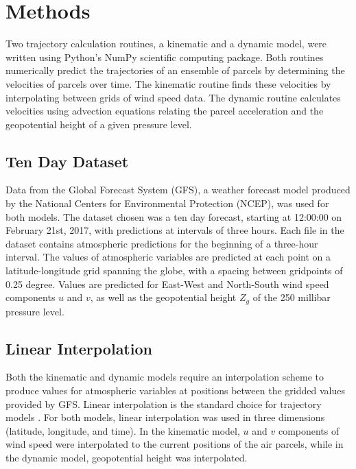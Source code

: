 \chapter{Methods}

Two trajectory calculation routines, a kinematic and a dynamic model, were written using Python's NumPy scientific computing package.
Both routines numerically predict the trajectories of an ensemble of parcels by determining the velocities of parcels over time. 
The kinematic routine finds these velocities by interpolating between grids of wind speed data. 
The dynamic routine calculates velocities using advection equations relating the parcel acceleration and the geopotential height of a given pressure level. 

\section{Ten Day Dataset}
Data from the Global Forecast System (GFS), a weather forecast model produced by the National Centers for Environmental Protection (NCEP), was used for both models.
The dataset chosen was a ten day forecast, starting at 12:00:00 on February 21st, 2017, with predictions at intervals of three hours.
Each file in the dataset contains atmospheric predictions for the beginning of a three-hour interval. 
The values of atmospheric variables are predicted at each point on a latitude-longitude grid spanning the globe, with a spacing between gridpoints of 0.25 degree.
Values are predicted for East-West and North-South wind speed components $u$ and $v$, as well as the geopotential height $Z_g$ of the 250 millibar pressure level.

\section{Linear Interpolation}
Both the kinematic and dynamic models require an interpolation scheme to produce values for atmospheric variables at positions between the gridded values provided by GFS. 
Linear interpolation is the standard choice for trajectory models \cite{bowman_input_2013}. 
For both models, linear interpolation was used in three dimensions (latitude, longitude, and time). 
In the kinematic model, $u$ and $v$ components of wind speed were interpolated to the current positions of the air parcels, while in the dynamic model, geopotential height was interpolated.

